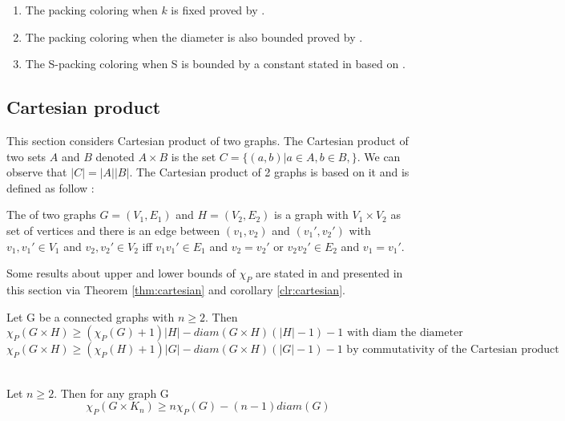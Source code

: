 \begin{enumerate}
\item The packing coloring when $k$ is fixed proved by \cite{PCComplexity}.
\item The packing coloring when the diameter is also bounded proved by \cite{PCComplexity}.
\item The S-packing coloring when S is bounded by a constant stated in \cite{PCComplexity} based on \cite{Borie}.
\end{enumerate}



\subsection{Cartesian product}

This section considers Cartesian product of two graphs. The Cartesian product of two sets $A$ and $B$ denoted $A \times B$ is the set $C = \{(a,b) | a \in A, b \in B, \}$. We can observe that $|C|=|A||B|$. The Cartesian product of 2 graphs is based on it and is defined as follow :

\begin{mydef}
The  of two graphs $G=(V_1,E_1)$ and $H=(V_2,E_2)$ is a graph with $V_1 \times V_2$ as set of vertices and there is an edge between $(v_1,v_2)$ and $(v_1 \prime,v_2 \prime)$ with $v_1,v_1\prime \in V_1 $ and $v_2,v_2\prime \in V_2$ iff $v_1v_1\prime \in E_1$ and $v_2=v_2\prime$  or $v_2v_2\prime \in E_2$ and $v_1=v_1\prime$.
\end{mydef}

Some results about upper and lower bounds of $\chi_{P}$ are stated in \cite{PCNLatice} and presented in this section via Theorem \ref{thm:cartesian} and corollary \ref{clr:cartesian}.

\begin{thm}
\label{thm:cartesian}
Let G be a connected graphs with $n \geq 2$. Then
\[ \chi_{P}(G \times H) \geq (\chi_{P}(G) +1)|H| - diam(G \times H)(|H| - 1) - 1 \text{ with diam the diameter}\]
\[ \chi_{P}(G \times H) \geq (\chi_{P}(H) +1)|G| - diam(G \times H)(|G| - 1) - 1 \text{ by commutativity of the Cartesian product} \] \\
\end{thm}


\begin{corollary}
\label{clr:cartesian}
Let $n \geq 2 $. Then for any graph G
\[\chi_{P}(G \times K_n) \geq n\chi_P(G) - (n-1)diam(G)  \]
\end{corollary}

